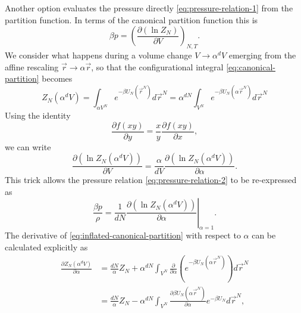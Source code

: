 Another option evaluates the pressure directly \eqref{eq:pressure-relation-1} from the partition function.
In terms of the canonical partition function this is
\begin{equation}\label{eq:pressure-relation-2}
  \beta p
  =
  \left( \frac{\partial (\ln{Z_N})}{\partial V} \right)_{N,T}.
\end{equation}
We consider what happens during a volume change $V \to \alpha^d V$ emerging from the affine rescaling $\vec{r} \to \alpha \vec{r}$, so that the configurational integral \eqref{eq:canonical-partition} becomes
\begin{equation}\label{eq:inflated-canonical-partition}
  Z_N(\alpha^d V)
  =
  \int_{\alpha V^N} e^{-\beta U_N(\vec{r}^N)} d\vec{r}^N
  =
  \alpha^{dN}
  \int_{V^N} e^{-\beta U_N(\alpha \vec{r}^N)} d\vec{r}^N
\end{equation}
Using the identity
\begin{equation*}
  \frac{\partial f(xy)}{\partial y}
  =
  \frac{x}{y} \frac{\partial f(xy)}{\partial x},
\end{equation*}
we can write
\begin{equation}
  \frac{\partial (\ln{Z_N(\alpha^d V)})}{\partial V}
  =
  \frac{\alpha}{d V}
  \frac{\partial (\ln{Z_N(\alpha^d V)})}{\partial \alpha}.
\end{equation}
This trick allows the pressure relation \eqref{eq:pressure-relation-2} to be re-expressed as
\begin{equation*}
  \frac{\beta p}{\rho}
  =
  \frac{1}{d N}
  \left.
  \frac{\partial (\ln{Z_N(\alpha^d V)})}{\partial \alpha}
  \right|_{\alpha = 1}.
\end{equation*}
The derivative of \eqref{eq:inflated-canonical-partition} with respect to $\alpha$ can be calculated explicitly as
\begin{equation*}
  \begin{split}
    \frac{\partial Z_N(\alpha^d V)}{\partial \alpha}
    &=
    \frac{dN}{\alpha} Z_N
    +
    \alpha^{dN}
    \int_{V^N}
    \frac{\partial}{\partial \alpha}
    \left( e^{-\beta U_N(\alpha \vec{r}^N)} \right)
    d\vec{r}^N
    \\ &=
    \frac{dN}{\alpha} Z_N
    -
    \alpha^{dN}
    \int_{V^N}
    \frac{\partial \beta U_N(\alpha \vec{r}^N)}{\partial \alpha}
    e^{-\beta U_N}
    d\vec{r}^N,
  \end{split}
\end{equation*}
